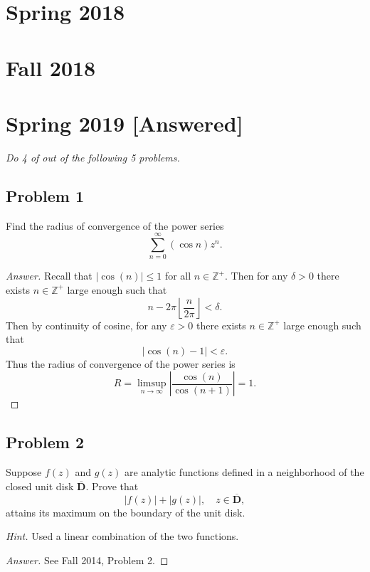 \documentclass[12pt]{article}
\newcommand{\z}{\mathbb{Z}}
\newcommand{\ita}[1]{\textit{#1}}
\newcommand\paren[1]{\left( #1 \right)}
\newcommand{\abs}[1]{\left| #1 \right|}
\newcommand{\eps}{\varepsilon}
\newcommand{\fl}[1]{\left \lfloor #1 \right \rfloor}
\theoremstyle{definition}
\begin{document}
\newpage 
\section{Spring 2018}

\newpage 
\section{Fall 2018}

\newpage 
\section{Spring 2019 [Answered]}
\ita{Do 4 of out of the following 5 problems.}
\subsection{Problem 1}
Find the radius of convergence of the power series 
\[
    \sum\limits_{n = 0}^{\infty} \paren{ \cos n } z^n . 
\]
\begin{proof}[Answer]
    Recall that $\abs{ \cos(n) } \leq 1$ for all $n \in \z^+$. Then for any $\delta > 0$ there exists $n \in \z^+$ large enough such that 
    \[
        n - 2\pi \fl{ \frac{n}{2\pi} } < \delta . 
    \]
    Then by continuity of cosine, for any $\eps > 0$ there exists $n \in \z^+$ large enough such that 
    \[
        \abs{ \cos(n) - 1 } < \eps . 
    \]
    Thus the radius of convergence of the power series is 
    \[
        R = \limsup\limits_{n \to \infty} \abs{ \frac{\cos(n)}{\cos(n+1)} } = \boxed{ 1. }
    \]
    
\end{proof}


\subsection{Problem 2}
Suppose $f(z)$ and $g(z)$ are analytic functions defined in a neighborhood of the closed unit disk $\overline{\mathbf{D}}$. Prove that 
\[
    \abs{ f(z) } + \abs{ g(z) } , \quad z \in \overline{ \mathbf{D} } , 
\]
attains its maximum on the boundary of the unit disk. 

\noindent \ita{Hint.} Used a linear combination of the two functions.

\begin{proof}[Answer]
    See Fall 2014, Problem 2.
\end{proof}
\end{document}
